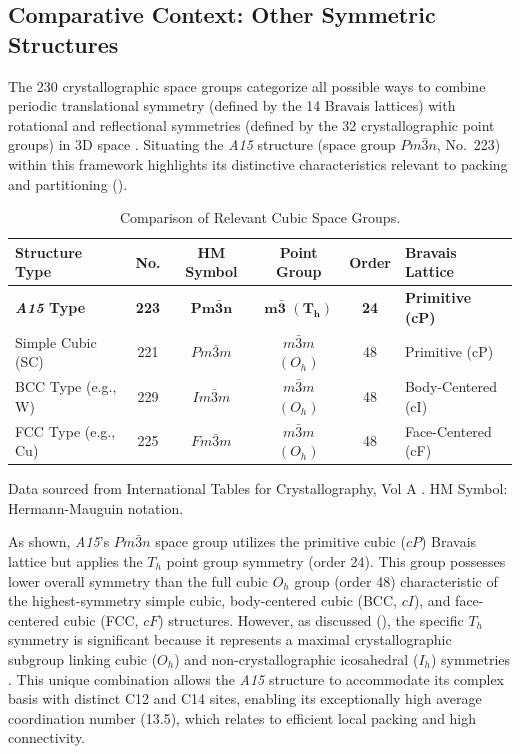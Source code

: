 \documentclass[10pt]{article}
\def\AAAB{\textit{A15}}
\begin{document}
\subsection{Comparative Context: Other Symmetric Structures}\label{subsec:comparison-structures}

The 230 crystallographic space groups categorize all possible ways to combine periodic translational symmetry (defined by the 14 Bravais lattices) with rotational and reflectional symmetries (defined by the 32 crystallographic point groups) in 3D space \cite{ITCVolumeA2016}. Situating the \AAAB{} structure (space group $Pm\bar{3}n$, No.~223) within this framework highlights its distinctive characteristics relevant to packing and partitioning ().

\begin{table}[!ht]
    \centering
    \caption{Comparison of Relevant Cubic Space Groups.}
    \label{tab:spacegroups}
    \begin{tabular}{l c c c c l}
        \toprule
        \textbf{Structure Type} & \textbf{No.} & \textbf{HM Symbol} & \textbf{Point Group} & \textbf{Order} & \textbf{Bravais Lattice} \\
        \midrule
        \textbf{\AAAB{} Type}  & \textbf{223} & $\boldsymbol{Pm\bar{3}n}$ & $\boldsymbol{m\bar{3}}$ $\boldsymbol{(T_h)}$ & \textbf{24} & \textbf{Primitive (cP)} \\ \addlinespace
        Simple Cubic (SC)      & 221          & $Pm\bar{3}m$              & $m\bar{3}m$ $(O_h)$                  & 48             & Primitive (cP) \\
        BCC Type (e.g., W)     & 229          & $Im\bar{3}m$              & $m\bar{3}m$ $(O_h)$                  & 48             & Body-Centered (cI) \\
        FCC Type (e.g., Cu)    & 225          & $Fm\bar{3}m$              & $m\bar{3}m$ $(O_h)$                  & 48             & Face-Centered (cF) \\
        \bottomrule
    \end{tabular}
    \vspace*{0.5ex}
    \par
    \footnotesize Data sourced from International Tables for Crystallography, Vol A \cite{ITCVolumeA2016}. HM Symbol: Hermann-Mauguin notation.
\end{table}

As shown, \AAAB{}'s $Pm\bar{3}n$ space group utilizes the primitive cubic ($cP$) Bravais lattice but applies the $T_h$ point group symmetry (order 24). This group possesses lower overall symmetry than the full cubic $O_h$ group (order 48) characteristic of the highest-symmetry simple cubic, body-centered cubic (BCC, $cI$), and face-centered cubic (FCC, $cF$) structures. However, as discussed (), the specific $T_h$ symmetry is significant because it represents a maximal crystallographic subgroup linking cubic ($O_h$) and non-crystallographic icosahedral ($I_h$) symmetries \cite{CoxeterMoser1972}. This unique combination allows the \AAAB{} structure to accommodate its complex basis with distinct C12 and C14 sites, enabling its exceptionally high average coordination number (13.5), which relates to efficient local packing and high connectivity.
\end{document}
